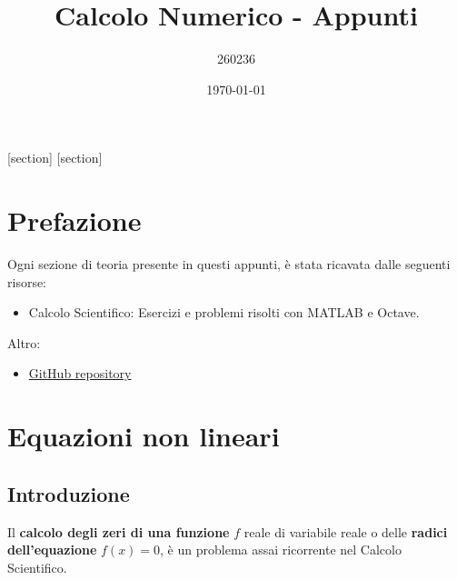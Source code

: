\documentclass[a4paper]{article}
\begin{document}
    [section]
    [section]
    
    

    \author{260236}
	\title{Calcolo Numerico - Appunti}
	\date{\printdayoff\today}
	\maketitle

	\newpage

    \section*{Prefazione}

    Ogni sezione di teoria presente in questi appunti, è stata ricavata dalle seguenti risorse:
    \begin{itemize}
        \item Calcolo Scientifico: Esercizi e problemi risolti con MATLAB e Octave.\cite{quarteroni2017calcolo}
    \end{itemize}
    Altro:
    \begin{itemize}
        \item[\faIcon{github}] \href{https://github.com/AndreVale69/HPC-E-PoliMI-university-notes}{GitHub repository}
    \end{itemize}
    
    \newpage
	
	\tableofcontents

    \newpage

    \section{Equazioni non lineari}

    \subsection{Introduzione}

    Il \textbf{calcolo degli zeri di una funzione} $f$ reale di variabile reale o delle \textbf{radici dell'equazione} $f\left(x\right)=0$, è un problema assai ricorrente nel Calcolo Scientifico.
\end{document}
